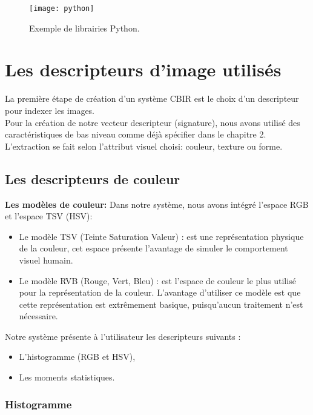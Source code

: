 \begin{figure}[H]
	\centering
	\texttt{[image: python]}
	\caption{Exemple de librairies Python.}
\end{figure}

\section{Les descripteurs d’image utilisés}
La première étape de création d'un système CBIR est le choix d'un descripteur pour indexer les images. \\
Pour la création de notre vecteur descripteur (signature), nous avons utilisé des caractéristiques de bas niveau comme déjà spécifier dans le chapitre 2. L'extraction se fait selon l'attribut visuel choisi: couleur, texture ou forme.
\subsection{Les descripteurs de couleur}
\textbf{Les modèles de couleur: }
Dans notre système, nous avons intégré l'espace RGB et l'espace TSV (HSV):\\

\begin{itemize}
	\item Le modèle TSV (Teinte Saturation Valeur) : est une représentation physique de la couleur, cet espace présente l’avantage de simuler le comportement visuel humain.
	
	\item Le modèle RVB (Rouge, Vert, Bleu) : est l’espace de couleur le plus utilisé pour la représentation de la couleur. L’avantage d’utiliser ce modèle est que cette représentation est extrêmement basique, puisqu’aucun traitement n’est nécessaire.\\
	
\end{itemize}

Notre système présente à l'utilisateur les descripteurs suivants :
\begin{itemize}
	\item L'histogramme (RGB et HSV),
	\item Les moments statistiques.
\end{itemize}

\subsubsection{Histogramme}
